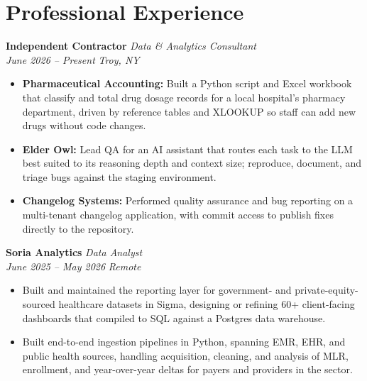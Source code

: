 \documentclass[10pt,letterpaper]{article}
\begin{document}
\section*{Professional Experience}

\noindent \textbf{Independent Contractor} \hfill \textit{Data \& Analytics Consultant} \\
\textit{June 2026 -- Present} \hfill \textit{Troy, NY}
\begin{itemize}[noitemsep, topsep=2pt]
        \item \textbf{Pharmaceutical Accounting:} Built a Python script and Excel workbook that classify and total drug dosage records for a local hospital's pharmacy department, driven by reference tables and XLOOKUP so staff can add new drugs without code changes.
        \item \textbf{Elder Owl:} Lead QA for an AI assistant that routes each task to the LLM best suited to its reasoning depth and context size; reproduce, document, and triage bugs against the staging environment.
        \item \textbf{Changelog Systems:} Performed quality assurance and bug reporting on a multi-tenant changelog application, with commit access to publish fixes directly to the repository.
\end{itemize}

\vspace{2pt}

\noindent \textbf{Soria Analytics} \hfill \textit{Data Analyst} \\
\textit{June 2025 -- May 2026} \hfill \textit{Remote}
\begin{itemize}[noitemsep, topsep=2pt]
    \item Built and maintained the reporting layer for government- and private-equity-sourced healthcare datasets in Sigma, designing or refining 60+ client-facing dashboards that compiled to SQL against a Postgres data warehouse.
    \item Built end-to-end ingestion pipelines in Python, spanning EMR, EHR, and public health sources, handling acquisition, cleaning, and analysis of MLR, enrollment, and year-over-year deltas for payers and providers in the sector.
\end{itemize}

\end{document}
